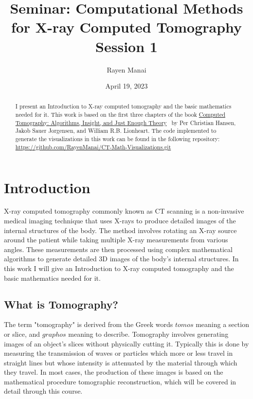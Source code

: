 \documentclass{article}
\title{\Large Seminar: Computational Methods for X-ray Computed Tomography \\
[5mm] \normalsize Session 1 \\
}
\author{Rayen Manai}
\date{April 19, 2023}
\begin{document}
\maketitle

\begin{abstract}
I present an Introduction to X-ray computed tomography and the basic mathematics needed for it. 
\newline 
	This work is based on the first three chapters of the book \href{https://epubs.siam.org/doi/book/10.1137/1.9781611976670}{Computed Tomography: Algorithms, Insight, and Just Enough Theory}~\cite{hansen2021computed} by Per Christian Hansen, Jakob Sauer Jorgensen, and William R.B. Lionheart. 
\newline 
	The code implemented to generate the visualizations in this work can be found in the following repository: \href{https://github.com/RayenManai/CT-Math-Visualizations.git}{https://github.com/RayenManai/CT-Math-Visualizations.git}
\end{abstract}

\tableofcontents
\pagebreak
\section{Introduction}
X-ray computed tomography commonly known as CT scanning is a non-invasive medical imaging technique that uses X-rays to produce detailed images of the internal structures of the body. The method involves rotating an X-ray source around the patient while taking multiple X-ray measurements from various angles. These measurements are then processed using complex mathematical algorithms to generate detailed 3D images of the body's internal structures.
In this work I will give an Introduction to X-ray computed tomography and the basic mathematics needed for it. 

 \subsection{What is Tomography?}
 The term "tomography" is derived from the Greek words $tomos$ meaning a section or slice, and $graphos$ meaning to describe. Tomography involves generating images of an object's slices without physically cutting it.
\newline
Typically this is done by measuring the transmission of waves or particles which more or less travel in straight lines but whose intensity is attenuated by the material through which they travel.
\newline
In most cases, the production of these images is based on the mathematical procedure tomographic reconstruction, which will be covered in detail through this course.
\end{document}

